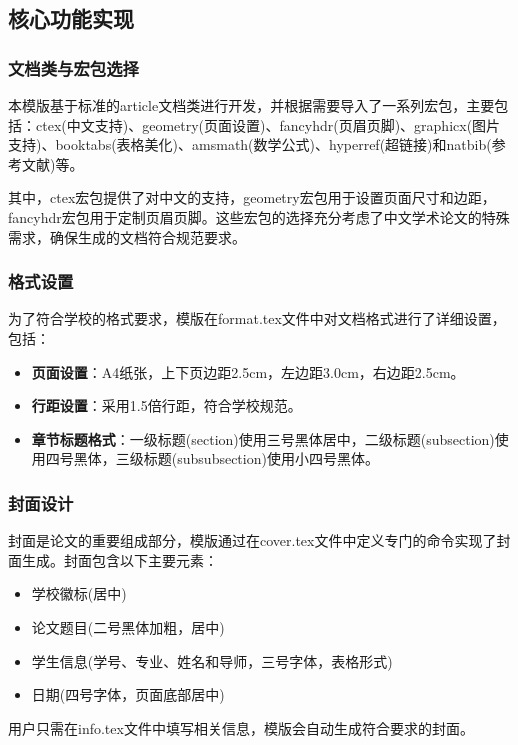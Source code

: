 \subsection{核心功能实现}

\subsubsection{文档类与宏包选择}
本模版基于标准的article文档类进行开发，并根据需要导入了一系列宏包，主要包括：ctex(中文支持)、geometry(页面设置)、fancyhdr(页眉页脚)、graphicx(图片支持)、booktabs(表格美化)、amsmath(数学公式)、hyperref(超链接)和natbib(参考文献)等。

其中，ctex宏包提供了对中文的支持，geometry宏包用于设置页面尺寸和边距，fancyhdr宏包用于定制页眉页脚。这些宏包的选择充分考虑了中文学术论文的特殊需求，确保生成的文档符合规范要求。

\subsubsection{格式设置}
为了符合学校的格式要求，模版在format.tex文件中对文档格式进行了详细设置，包括：

\begin{itemize}
    \item \textbf{页面设置}：A4纸张，上下页边距2.5cm，左边距3.0cm，右边距2.5cm。
    \item \textbf{行距设置}：采用1.5倍行距，符合学校规范。
    \item \textbf{章节标题格式}：一级标题(section)使用三号黑体居中，二级标题(subsection)使用四号黑体，三级标题(subsubsection)使用小四号黑体。
\end{itemize}

\subsubsection{封面设计}
封面是论文的重要组成部分，模版通过在cover.tex文件中定义专门的命令实现了封面生成。封面包含以下主要元素：

\begin{itemize}
    \item 学校徽标(居中)
    \item 论文题目(二号黑体加粗，居中)
    \item 学生信息(学号、专业、姓名和导师，三号字体，表格形式)
    \item 日期(四号字体，页面底部居中)
\end{itemize}

用户只需在info.tex文件中填写相关信息，模版会自动生成符合要求的封面。

